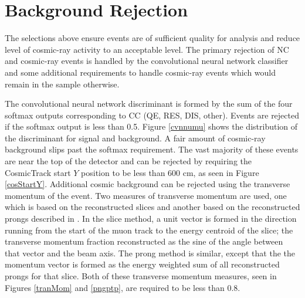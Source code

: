 \section{Background Rejection}

The selections above ensure events are of sufficient quality for analysis
and reduce level of cosmic-ray activity to an acceptable level.
The primary rejection of NC and cosmic-ray events is handled by
the convolutional neural network classifier and some additional requirements
to handle cosmic-ray events which would remain in the sample otherwise.

The convolutional neural network discriminant is formed by the sum of the four
softmax outputs corresponding to \numu CC (QE, RES, DIS, other).
Events are rejected if the softmax output is less than 0.5.
Figure \ref{cvnnumu} shows the distribution of the discriminant for
signal and background.
A fair amount of cosmic-ray background slips past the softmax requirement.
The vast majority of these events are near the top of the detector
and can be rejected by requiring the CosmicTrack start $Y$ position to be less
than 600 cm, as seen in Figure \ref{cosStartY}.
Additional cosmic background can be rejected using the transverse momentum
of the event.
Two measures of transverse momentum are used, one which is based
on the reconstructed slices and another based on the reconstructed prongs
described in \cite{niner2015thesis}.
In the slice method, a unit vector is formed in the direction running
from the start of the muon track to the energy centroid of the slice;
the transverse momentum fraction reconstructed as the sine of the angle
between that vector and the beam axis.
The prong method is similar, except that the the momentum vector
is formed as the energy weighted sum of all reconstructed prongs
for that slice.
Both of these transverse momentum measures, seen in Figures \ref{tranMom} and
\ref{pngptp}, are required to be less than 0.8.



